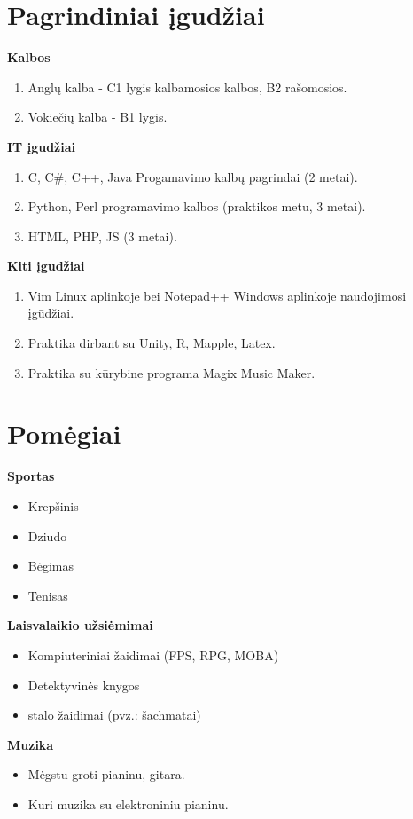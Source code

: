 \documentclass[a4paper,12pt]{article}
\begin{document}
\section{Pagrindiniai įgudžiai}
\textbf{Kalbos}
\begin{enumerate}
	\item Anglų kalba - C1 lygis kalbamosios kalbos, B2 rašomosios. 
	\item Vokiečių kalba - B1 lygis.
\end{enumerate}

\textbf{IT įgudžiai}
\begin{enumerate}
	\item C, C\#, C++, Java Progamavimo kalbų pagrindai (2 metai).
	\item Python, Perl programavimo kalbos (praktikos metu, 3 metai).
	\item HTML, PHP, JS (3 metai).
\end{enumerate}

\textbf{Kiti įgudžiai}
\begin{enumerate}
	\item Vim Linux aplinkoje bei Notepad++ Windows aplinkoje naudojimosi įgūdžiai.
	\item Praktika dirbant su Unity, R, Mapple, Latex.
	\item Praktika su kūrybine programa Magix Music Maker.
\end{enumerate}

\clearpage

\section{Pomėgiai}
\textbf{Sportas}
\begin{itemize}
	\item Krepšinis
	\item Dziudo
	\item Bėgimas
	\item Tenisas
\end{itemize}

\textbf{Laisvalaikio užsiėmimai}
\begin{itemize}
	\item Kompiuteriniai žaidimai (FPS, RPG, MOBA)
	\item Detektyvinės knygos
	\item stalo žaidimai (pvz.: šachmatai)
\end{itemize}

\textbf{Muzika}
\begin{itemize}
	\item Mėgstu groti pianinu, gitara.
	\item Kuri muzika su elektroniniu pianinu.
\end{itemize}
\end{document}
